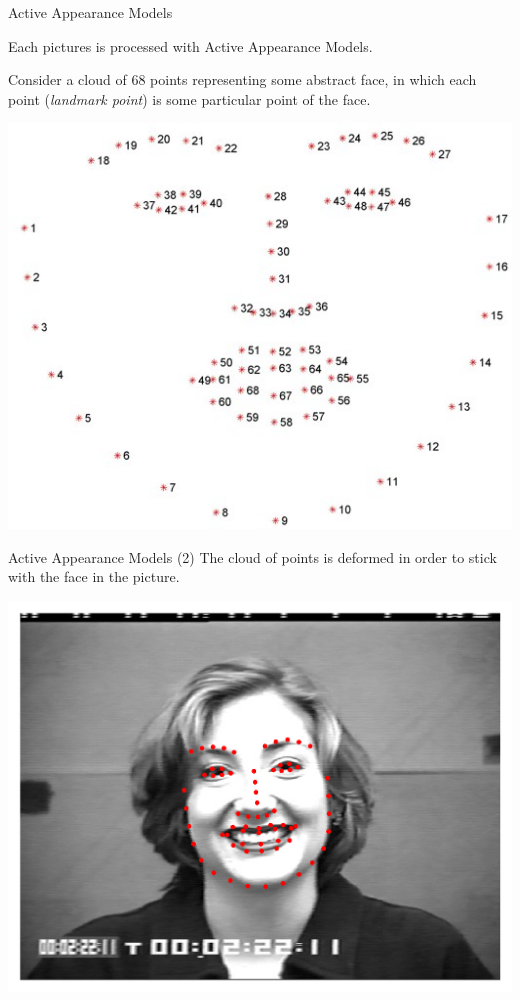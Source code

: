\begin{frame}{Active Appearance Models}

Each pictures is processed with Active Appearance Models.

\bigskip Consider a cloud of 68 points representing some abstract face, in which each point (\emph{landmark point}) is some particular point of the face.

\bigskip\centering\includegraphics[width=.5\textwidth]{img/lec5f/template.jpg}
\end{frame}

\begin{frame}{Active Appearance Models (2)}
The cloud of points is deformed in order to stick with the face in the picture.

\bigskip\centering\includegraphics[width=.6\textwidth]{img/lec5f/S046_005_00000023.png}
\end{frame}